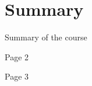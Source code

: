 \section*{Summary}


\small

\begin{frame}{Summary of the course}



\end{frame}

\begin{frame}{Page 2}


  
\end{frame}

\begin{frame}{Page 3}


  
\end{frame}





